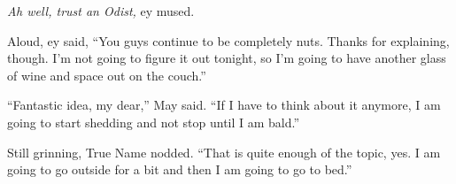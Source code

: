 \emph{Ah well, trust an Odist,} ey mused.

Aloud, ey said, ``You guys continue to be completely nuts. Thanks for explaining, though. I'm not going to figure it out tonight, so I'm going to have another glass of wine and space out on the couch.''

``Fantastic idea, my dear,'' May said. ``If I have to think about it anymore, I am going to start shedding and not stop until I am bald.''

Still grinning, True Name nodded. ``That is quite enough of the topic, yes. I am going to go outside for a bit and then I am going to go to bed.''
